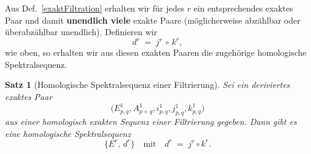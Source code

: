 \documentclass[12pt]{article}
\numberwithin{conj}{section}
\newtheorem{theorem}[conj]{Satz}
\begin{document}
    Aus Def.~\ref{exaktFiltration} erhalten wir für jedes $r$ ein
    entsprechendes exaktes Paar und damit \textbf{unendlich viele} exakte Paare (möglicherweise
    abzählbar oder überabzählbar unendlich). Definieren wir
    \[
        d^{r} \;=\; j^{r} \,\circ\, k^{r},
    \]
    wie oben, so erhalten wir aus diesen exakten Paaren die zugehörige homologische
    Spektralsequenz.

    \begin{theorem}[Homologische Spektralsequenz einer Filtrierung]
        Sei ein deriviertes exaktes Paar
        \[
            \bigl(E^{1}_{p,q}, A^{1}_{p+q}, i^{1}_{p,q}, j^{1}_{p,q}, k^{1}_{p,q}\bigr)
        \]
        aus einer homologisch exakten Sequenz einer Filtrierung gegeben. Dann gibt
        es eine homologische Spektralsequenz
        \[
            \{E^{r},\,d^{r}\}\quad\text{mit}\quad d^{r} \;=\; j^{r} \circ k^{r}.
        \]
    \end{theorem}
\end{document}
